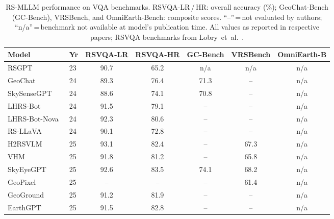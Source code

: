 \begin{table}[t]
\caption{RS-MLLM performance on VQA benchmarks. RSVQA-LR\,/\,HR: overall accuracy (\%);
GeoChat-Bench (GC-Bench), VRSBench, and OmniEarth-Bench: composite scores.
``--''\,=\,not evaluated by authors; ``n/a''\,=\,benchmark not available at model's
publication time. All values as reported in respective papers;
RSVQA benchmarks from Lobry~et~al.~\cite{rsvqa2020}.}\label{tab:vqa}
\footnotesize\setlength\tabcolsep{2pt}
\begin{tabular*}{\textwidth}{@{\extracolsep\fill}lp{0.25cm}ccccc}
\toprule
\textbf{Model} & \textbf{Yr} &
\textbf{RSVQA-LR} & \textbf{RSVQA-HR} &
\textbf{GC-Bench} & \textbf{VRSBench} & \textbf{OmniEarth-B} \\
\midrule
RSGPT~\cite{rsgpt2023}                    & 23 & 90.7 & 65.2 & n/a  & n/a  & n/a \\
GeoChat~\cite{geochat2024}                & 24 & 89.3          & 76.4          & 71.3          & --            & n/a \\
SkySenseGPT~\cite{skysensegpt2024}        & 24 & 88.6          & 74.1          & 70.8          & --            & n/a \\
LHRS-Bot~\cite{lhrsbot2024}               & 24 & 91.5          & 79.1          & --            & --            & n/a \\
LHRS-Bot-Nova~\cite{lhrsbotnova2024}      & 24 & 92.3          & 80.6          & --            & --            & n/a \\
RS-LLaVA~\cite{rsllava2024}               & 24 & 90.1          & 72.8          & --            & --            & n/a \\
H2RSVLM~\cite{h2rsvlm2025}               & 25 & 93.1          & 82.4          & --            & 67.3          & n/a \\
VHM~\cite{vhm2025}                        & 25 & 91.8          & 81.2          & --            & 65.8          & n/a \\
SkyEyeGPT~\cite{skyeyegpt2025}            & 25 & 92.6          & 83.5          & 74.1          & 68.2          & n/a \\
GeoPixel~\cite{geopixel2025}              & 25 & --            & --            & --            & 61.4          & n/a \\
GeoGround~\cite{geoground2025}            & 25 & 91.2          & 81.9          & --            & --            & n/a \\
EarthGPT~\cite{earthgpt2025}              & 25 & 91.5          & 82.8          & --            & --            & n/a \\

\end{tabular*}
\end{table}
